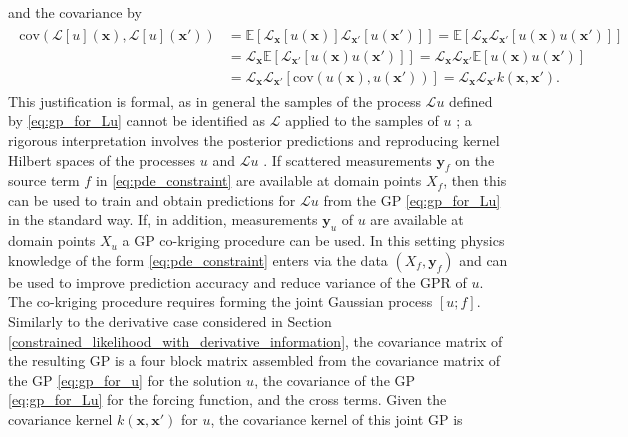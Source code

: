 and the covariance by
\begin{align}
\begin{split}
\label{eq:cov_f_f}
\text{cov}\left( \mathcal{L}[u](\mathbf{x}) , \mathcal{L}[u](\mathbf{x'}) \right) &= 
\mathbb{E} \left[ \mathcal{L}_{\mathbf{x}} [u(\mathbf{x})] \mathcal{L}_{\mathbf{x'}} [u (\mathbf{x'})] \right] =
\mathbb{E} \left[ \mathcal{L}_{\mathbf{x}} \mathcal{L}_{\mathbf{x'}} \left[ u(\mathbf{x}) u(\mathbf{x'}) \right] \right] \\
\qquad &=  \mathcal{L}_{\mathbf{x}}  \mathbb{E} \left[ \mathcal{L}_{\mathbf{x'}} \left[ u(\mathbf{x}) u(\mathbf{x'}) \right] \right] 
= \mathcal{L}_{\mathbf{x}} \mathcal{L}_{\mathbf{x'}} \mathbb{E} \left[ u(\mathbf{x}) u(\mathbf{x'}) \right] \\
&= \mathcal{L}_{\mathbf{x}} \mathcal{L}_{\mathbf{x'}}  \left[ \text{cov}\left( u(\mathbf{x}), u(\mathbf{x'}) \right) \right] 
= \mathcal{L}_{\mathbf{x}} \mathcal{L}_{\mathbf{x'}}  k(\mathbf{x}, \mathbf{x'}).
\end{split}
\end{align}
This justification is formal, as in general the samples of the process $\mathcal{L}u$ defined by \eqref{eq:gp_for_Lu} cannot be identified as $\mathcal{L}$ applied to the samples of $u$ ; a rigorous interpretation involves the posterior predictions and reproducing kernel Hilbert spaces of the processes $u$ and $\mathcal{L}u$ . 
If scattered measurements
$\mathbf{y}_f$ 
on the source term $f$ in \eqref{eq:pde_constraint} are available at domain points $X_f$,
then this can be used to train and obtain predictions for $\mathcal{L}u$ from the GP \eqref{eq:gp_for_Lu}  in the standard way. If, in addition, measurements $\mathbf{y}_u$
of $u$ are available at domain points $X_u$
a GP co-kriging procedure can be used. In this setting physics knowledge of the form \eqref{eq:pde_constraint} enters via the data $(X_f, \mathbf{y}_f)$ and can be used to improve prediction accuracy and reduce variance of the GPR of $u$. 
The co-kriging procedure requires forming the joint Gaussian process $[u;f]$.
Similarly to the derivative case considered in Section \ref{constrained_likelihood_with_derivative_information}, the covariance matrix of the resulting GP is a four block matrix assembled from
the covariance matrix of the GP \eqref{eq:gp_for_u} for the solution $u$, the covariance of the GP \eqref{eq:gp_for_Lu} for the forcing function, and the cross terms.
Given the covariance kernel $k(\mathbf{x}, \mathbf{x}')$ for $u$, the covariance kernel of this joint GP 
is
